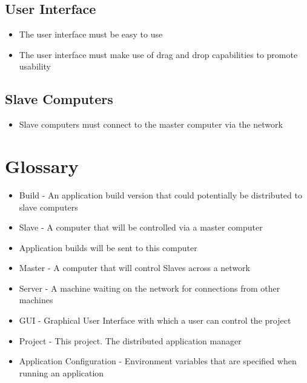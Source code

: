 \documentclass[a4paper,12pt,final]{article}
\begin{document}
\subsection{User Interface}
\begin{itemize}
\item The user interface must be easy to use
\item The user interface must make use of drag and drop capabilities to promote usability
\end{itemize}

\subsection{Slave Computers}
\begin{itemize}
\item Slave computers must connect to the master computer via the network
\end{itemize}



\section{Glossary}
\begin{itemize}
\item Build - An application build version that could potentially be distributed to slave computers
\item Slave - A computer that will be controlled via a master computer
\item Application builds will be sent to this computer
\item Master - A computer that will control Slaves across a network
\item Server - A machine waiting on the network for connections from other machines
\item GUI - Graphical User Interface with which a user can control the project
\item Project - This project. The distributed application manager
\item Application Configuration - Environment variables that are specified when running an application
\end{itemize}
\end{document}
